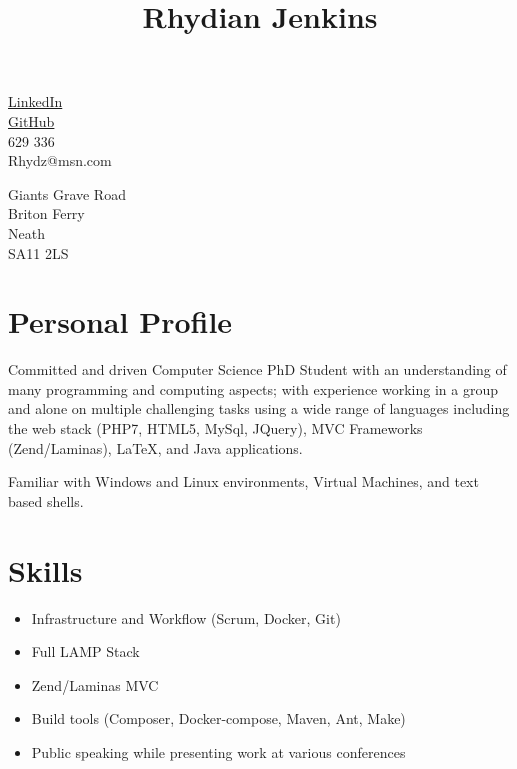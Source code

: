 \documentclass[10pt]{article}
\title{\bfseries\Huge Rhydian Jenkins}
\date{}
\author{}
\begin{document}
\maketitle \vspace{-7em}

\section*{}
\begin{minipage}{0.5\textwidth}
	\faLinkedin \quad \href{https://www.linkedin.com/in/rhydian-jenkins-30309085/}{LinkedIn}\\
	\faGithub \quad \href{https://github.com/RhydianJenkins}{GitHub}\\
	\faPhone {} 629 336\\
	\faEnvelope \quad Rhydz@msn.com
\end{minipage}
\begin{minipage}{0.5\textwidth}
    \begin{flushright}
	Giants Grave Road\\
	Briton Ferry\\
	Neath\\
    SA11 2LS
    \end{flushright}
\end{minipage}

\section*{Personal Profile}
\noindent Committed and driven Computer Science PhD Student with an understanding of many programming and computing aspects; with experience working in a group and alone on multiple challenging tasks using a wide range of languages including the web stack (PHP7, HTML5, MySql, JQuery), MVC Frameworks (Zend/Laminas), \LaTeX, and Java applications.

\noindent Familiar with Windows and Linux environments, Virtual Machines, and text based shells.

\section*{Skills}
\begin{itemize} \setlength\itemsep{-0.25em}
	\item Infrastructure and Workflow (Scrum, Docker, Git)
	\item Full LAMP Stack
	\item Zend/Laminas MVC
	\item Build tools (Composer, Docker-compose, Maven, Ant, Make)
	\item Public speaking while presenting work at various conferences
\end{itemize}
\end{document}
